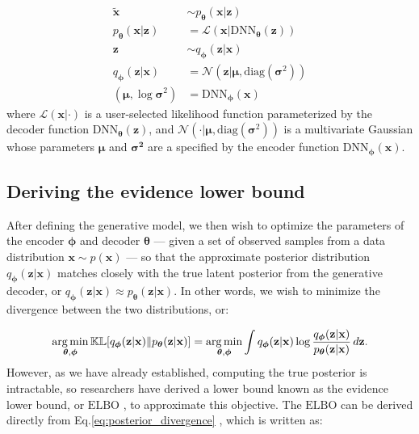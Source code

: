 \begin{subequations}
\begin{align}
    \tilde{\mathbf{x}} &\sim
    p_{\boldsymbol{\theta}}(\mathbf{x} | \mathbf{z}) \label{eq:recon}\\
    p_{\boldsymbol{\theta}}(\mathbf{x} | \mathbf{z}) &= \mathcal{L} \left( \mathbf{x} | \mathrm{DNN}_{\boldsymbol{\theta}}(\mathbf{z}) \right) \label{eq:likelihood}\\
    \mathbf{z} &\sim
    q_{\boldsymbol{\phi}}(\mathbf{z} | \mathbf{x})\label{eq:sample}\\
    q_{\boldsymbol{\phi}}(\mathbf{z} | \mathbf{x}) &= \mathcal{N}(\mathbf{z} | \boldsymbol{\mu}, \mathrm{diag}(\boldsymbol{\sigma}^2)) \label{eq:approx}\\
    (\boldsymbol{\mu}, \log \boldsymbol{\sigma}^2) &= \mathrm{DNN}_{\boldsymbol{\phi}}(\mathbf{x})\label{eq:encoder}
\end{align}
\end{subequations}
where $\mathcal{L}(\mathbf{x}| \cdot)$ is a user-selected likelihood function parameterized by the decoder function $\mathrm{DNN}_{\boldsymbol{\theta}}(\mathbf{z})$, and $\mathcal{N}(\cdot | \boldsymbol{\mu}, \mathrm{diag}(\boldsymbol{\sigma}^2))$ is a multivariate Gaussian whose parameters $\boldsymbol{\mu}$ and $\boldsymbol{\boldsymbol{\sigma}^2}$ are a specified by the encoder function $\mathrm{DNN}_{\boldsymbol{\phi}}(\mathbf{x})$. 

\subsection{Deriving the evidence lower bound}
\label{appendix:elbo}
After defining the generative model, we then wish to optimize the parameters of the encoder $\boldsymbol{\phi}$ and decoder $\boldsymbol{\theta}$ --- given a set of observed samples from a data distribution $\mathbf{x} \sim p(\mathbf{x})$ --- so that the approximate posterior distribution $q_{\boldsymbol{\phi}}(\mathbf{z} | \mathbf{x})$ matches closely with the true latent posterior from the generative decoder, or $q_{\boldsymbol{\phi}}(\mathbf{z} | \mathbf{x}) \approx p_{\boldsymbol{\theta}}(\mathbf{z} | \mathbf{x})$. In other words, we wish to minimize the divergence between the two distributions, or:

\begin{equation}
    \label{eq:posterior_divergence}
    \operatorname*{arg\,min}_{\boldsymbol{\theta}, \boldsymbol{\phi}} \mathbb{KL}[q_{\boldsymbol{\phi}}(\mathbf{z} | \mathbf{x}) \| p_{\boldsymbol{\theta}}(\mathbf{z} | \mathbf{x})] = \operatorname*{arg\,min}_{\boldsymbol{\theta}, \boldsymbol{\phi}} \int q_{\boldsymbol{\phi}}(\mathbf{z} | \mathbf{x}) \log \frac{q_{\boldsymbol{\phi}}(\mathbf{z} | \mathbf{x})}{p_{\boldsymbol{\theta}}(\mathbf{z} | \mathbf{x})} \, d{\mathbf{z}}.
\end{equation}
However, as we have already established, computing the true posterior is intractable, so researchers have derived a lower bound known as the evidence lower bound, or $\mathrm{ELBO}$ \citep{kingma2013vae}, to approximate this objective. The $\mathrm{ELBO}$ can be derived directly from Eq.\ref{eq:posterior_divergence} \citep{adams2020}, which is written as:

